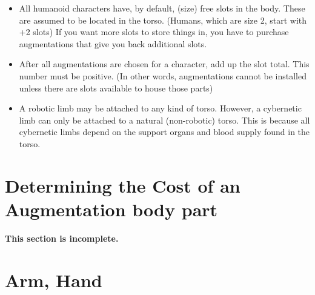 \documentclass[twoside]{book}
\begin{document}
\begin{itemize}
      
  \item All humanoid characters have, by default, (size) free slots in the body. These are assumed to be located in the torso. (Humans, which are size 2, start with +2 slots) If you want more slots to store things in, you have to purchase augmentations that give you back additional slots.
  \item After all augmentations are chosen for a character, add up the slot total. This number must be positive. (In other words, augmentations cannot be installed unless there are slots available to house those parts)
  \item A robotic limb may be attached to any kind of torso. However, a cybernetic limb can only be attached to a natural (non-robotic) torso. This is because all cybernetic limbs depend on the support organs and blood supply found in the torso.
\end{itemize}
  
    

\section{Determining the Cost of an Augmentation body part}
    

 \textbf{This section is incomplete.}


    

\section{Arm, Hand}
    
\end{document}
